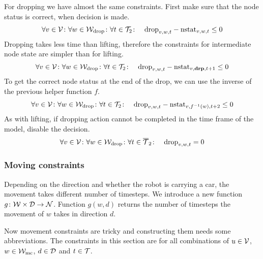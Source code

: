 For dropping we have almost the same constraints. First make sure that the node
status is correct, when decision is made.
\begin{align}
    &\forall v \in \mathcal{V} \colon \forall w \in \mathcal{W}_\mathrm{drop} \colon \forall t \in \mathcal{T}_2 \colon
    &\mathrm{drop}_{v,w,t} - \mathrm{nstat}_{v,w,t} \leq 0
\end{align}
Dropping takes less time than lifting, therefore the constraints for
intermediate node state are simpler than for lifting.
\begin{align}
    &\forall v \in \mathcal{V} \colon \forall w \in \mathcal{W}_\mathrm{drop} \colon \forall t \in \mathcal{T}_2 \colon
    &\mathrm{drop}_{v,w,t} - \mathrm{nstat}_{v,\text{\bf drp},t+1} \leq 0
\end{align}
To get the correct node status at the end of the drop, we can use the inverse
of the previous helper function $f$.
\begin{align}
    &\forall v \in \mathcal{V} \colon \forall w \in \mathcal{W}_\mathrm{drop} \colon \forall t \in \mathcal{T}_2 \colon
    &\mathrm{drop}_{v,w,t} - \mathrm{nstat}_{v,f^{-1}(w),t+2} \leq 0
\end{align}
As with lifting, if dropping action cannot be completed in the time frame of
the model, disable the decision.
\begin{align}
    &\forall v \in \mathcal{V} \colon \forall w \in \mathcal{W}_\mathrm{drop} \colon \forall t \in \overline{\mathcal{T}}_2
    \colon &\mathrm{drop}_{v,w,t} = 0
\end{align}

\subsubsection{Moving constraints}
Depending on the direction and whether the robot is carrying a car, the
movement takes different number of timesteps. We introduce a new function $g
\colon \mathcal{W} \times \mathcal{D} \to \mathcal{N}$. Function $g(w,d)$ returns the number of
timesteps the movement of $w$ takes in direction $d$. 

Now movement constraints are tricky and constructing them needs some
abbreviations. The constraints in this section are for all combinations of $u
\in \mathcal{V}$, $w \in \mathcal{W}_\mathrm{mc}$, $d \in \mathcal{D}$ and $t \in \mathcal{T}$.

